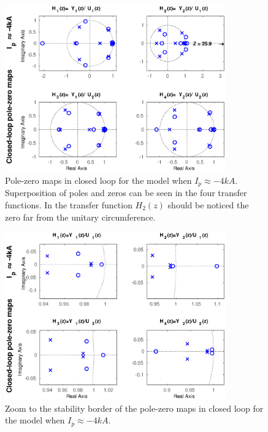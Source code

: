 \begin{figure}
	\centering
	\includegraphics[width=0.85\textwidth]{Chp5/PoleZero/PoleZeroCloseNeg.eps}
	\caption{ Pole-zero maps in closed loop for the model when $I_p\approx -4 kA$. Superposition  of poles and zeros can be seen in the four transfer functions. In the transfer function $H_2(z)$ should be noticed the zero far from the unitary circumference. \label{PoleZeroCloseNeg}}
\end{figure}	

\begin{figure}
	\centering
	\includegraphics[width=0.85\textwidth]{Chp5/PoleZero/PoleZeroCloseNegZoom.eps}
\caption{Zoom to the stability border of the pole-zero maps in closed loop for the model when $I_p\approx -4 kA$.	\label{PoleZeroCloseNegZoom}}
\end{figure}	


